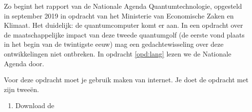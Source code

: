 \documentclass[../../main.tex]{subfiles}
\begin{document}
Zo begint het rapport van de Nationale Agenda Quantumtechnologie, opgesteld in september 2019 in opdracht van het  Ministerie van Economische Zaken en Klimaat. Het duidelijk: de quantumcomputer komt er aan.
In een opdracht over de maatschappelijke impact van deze tweede quantumgolf (de eerste vond plaats in het begin van de twintigste eeuw) mag een gedachtewisseling over deze ontwikkelingen niet ontbreken. In opdracht \ref{opd:lang} lezen we de Nationale Agenda door. 
\begin{opdrachtlang}\label{opd:lang}%
Voor deze opdracht moet je gebruik maken van internet. Je doet de opdracht  met zijn  twee\"en. 
\begin{enumerate}
\item Download de  


\end{enumerate}
\end{opdrachtlang}
\end{document}
